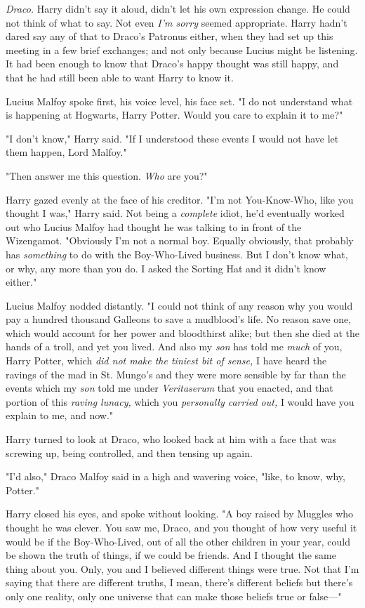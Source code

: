 \emph{Draco.} Harry didn't say it aloud, didn't let his own expression change.
He could not think of what to say. Not even \emph{I'm sorry} seemed
appropriate. Harry hadn't dared say any of that to Draco's Patronus either,
when they had set up this meeting in a few brief exchanges; and not only
because Lucius might be listening. It had been enough to know that Draco's
happy thought was still happy, and that he had still been able to want Harry to
know it.

Lucius Malfoy spoke first, his voice level, his face set. "I do not understand
what is happening at Hogwarts, Harry Potter. Would you care to explain it to
me?"

"I don't know," Harry said. "If I understood these events I would not have let
them happen, Lord Malfoy."

"Then answer me this question. \emph{Who} are you?"

Harry gazed evenly at the face of his creditor. "I'm not You-Know-Who, like you
thought I was," Harry said. Not being a \emph{complete} idiot, he'd eventually
worked out who Lucius Malfoy had thought he was talking to in front of the
Wizengamot. "Obviously I'm not a normal boy. Equally obviously, that probably
has \emph{something} to do with the Boy-Who-Lived business. But I don't know
what, or why, any more than you do. I asked the Sorting Hat and it didn't know
either."

Lucius Malfoy nodded distantly. "I could not think of any reason why you would
pay a hundred thousand Galleons to save a mudblood's life. No reason save one,
which would account for her power and bloodthirst alike; but then she died at
the hands of a troll, and yet you lived. And also my \emph{son} has told me
\emph{much} of you, Harry Potter, which \emph{did not make the tiniest bit of
sense,} I have heard the ravings of the mad in St. Mungo's and they were more
sensible by far than the events which my \emph{son} told me under
\emph{Veritaserum} that you enacted, and that portion of this \emph{raving
lunacy,} which you \emph{personally carried out,} I would have you explain to
me, and now."

Harry turned to look at Draco, who looked back at him with a face that was
screwing up, being controlled, and then tensing up again.

"I'd also," Draco Malfoy said in a high and wavering voice, "like, to know,
why, Potter."

Harry closed his eyes, and spoke without looking. "A boy raised by Muggles who
thought he was clever. You saw me, Draco, and you thought of how very useful it
would be if the Boy-Who-Lived, out of all the other children in your year,
could be shown the truth of things, if we could be friends. And I thought the
same thing about you. Only, you and I believed different things were true. Not
that I'm saying that there are different truths, I mean, there's different
beliefs but there's only one reality, only one universe that can make those
beliefs true or false—"

